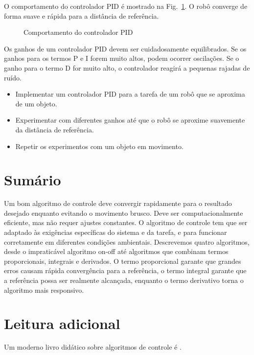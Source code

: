 O comportamento do controlador PID é mostrado na Fig.~\ref{fig.pid-control}. O robô converge de forma suave e rápida para a distância de referência. 

\begin{figure}
\begin{center}
\caption{Comportamento do controlador PID}\label{fig.pid-control}
\end{center}
\end{figure}

Os ganhos de um controlador PID devem ser cuidadosamente equilibrados. Se os ganhos para os termos P e I forem muito altos, podem ocorrer oscilações. Se o ganho para o termo D for muito alto, o controlador reagirá a pequenas rajadas de ruído.

\begin{framed}
\begin{itemize}
\item Implementar um controlador PID para a tarefa de um robô que se aproxima de um objeto.
\item Experimentar com diferentes ganhos até que o robô se aproxime suavemente da distância de referência.
\item Repetir os experimentos com um objeto em movimento.
\end{itemize}
\end{framed}

\section{Sumário}

Um bom algoritmo de controle deve convergir rapidamente para o resultado desejado enquanto
evitando o movimento brusco. Deve ser computacionalmente eficiente, mas não requer ajustes constantes. O algoritmo de controle tem que ser adaptado às exigências específicas do sistema e da tarefa, e para funcionar corretamente em diferentes condições ambientais. Descrevemos quatro algoritmos, desde o impraticável algoritmo on-off até algoritmos que combinam termos proporcionais, integrais e derivados. O termo proporcional garante que grandes erros causam rápida convergência para a referência, o termo integral garante que a referência possa ser realmente alcançada, enquanto o termo derivativo torna o algoritmo mais responsivo. 

\section{Leitura adicional}

Um moderno livro didático sobre algoritmos de controle é \cite{astrom-murray}.
